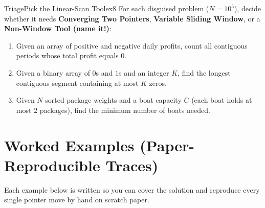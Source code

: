 \documentclass[11pt,a4paper]{article}
\theoremstyle{definition}
\begin{document}
\begin{tryitbox}{Triage}{Pick the Linear-Scan Tool}{ex8}
For each disguised problem ($N = 10^5$), decide whether it needs \textbf{Converging Two Pointers}, \textbf{Variable Sliding Window}, or a \textbf{Non-Window Tool (name it!)}:
\begin{enumerate}[itemsep=2pt, topsep=2pt]
    \item Given an array of positive and negative daily profits, count all contiguous periods whose total profit equals $0$.
    \item Given a binary array of $0$s and $1$s and an integer $K$, find the longest contiguous segment containing at most $K$ zeros.
    \item Given $N$ sorted package weights and a boat capacity $C$ (each boat holds at most $2$ packages), find the minimum number of boats needed.
\end{enumerate}
\end{tryitbox}

\section{Worked Examples (Paper-Reproducible Traces)}

Each example below is written so you can cover the solution and reproduce every single pointer move by hand on scratch paper.
\end{document}
